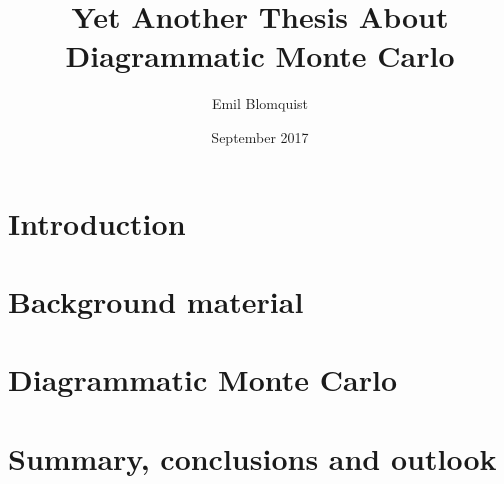 \documentclass[nocoverpage,swedish,g5paper]{thesis}
\title{Yet Another Thesis About Diagrammatic Monte Carlo}
\author{Emil Blomquist}
\date{September 2017}
\begin{document}
\begin{abstract}

\end{abstract}

\begin{otherlanguage}{swedish}
\begin{foreginabstract}

\end{foreginabstract}
\end{otherlanguage}

\begin{preface}

\end{preface}

\tableofcontents

\mainmatter




\chapter{Introduction}


\chapter{Background material}


\chapter{Diagrammatic Monte Carlo}
 

\chapter{Summary, conclusions and outlook}


%

\cleardoublepage
{}




%
\end{document}

